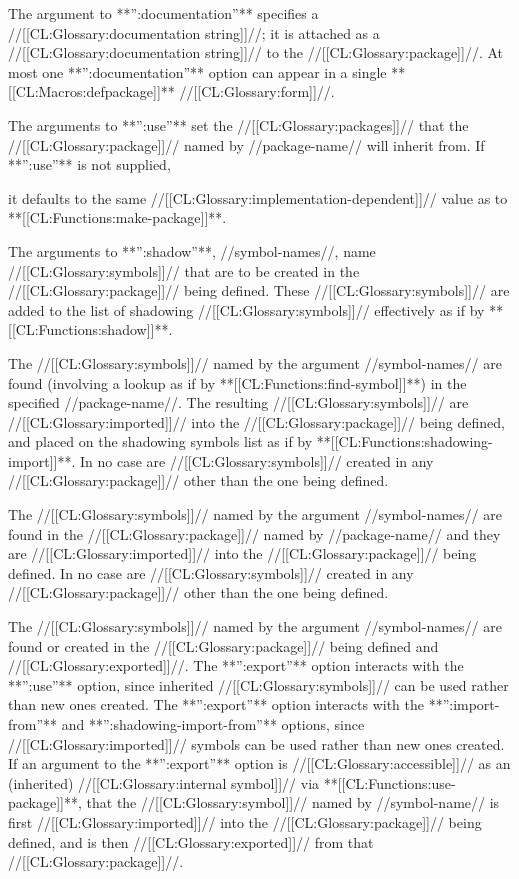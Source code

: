 The argument to **'':documentation''** specifies a //[[CL:Glossary:documentation string]]//; it is attached as a //[[CL:Glossary:documentation string]]// to the //[[CL:Glossary:package]]//. At most one **'':documentation''** option can appear in a single **[[CL:Macros:defpackage]]** //[[CL:Glossary:form]]//.


The arguments to **'':use''** set the //[[CL:Glossary:packages]]// that the //[[CL:Glossary:package]]// named by //package-name// will inherit from. If **'':use''** is not supplied,

it defaults to the same //[[CL:Glossary:implementation-dependent]]// value as  to **[[CL:Functions:make-package]]**.



The arguments to **'':shadow''**, //symbol-names//, name //[[CL:Glossary:symbols]]// that are to be created in the //[[CL:Glossary:package]]// being defined. These //[[CL:Glossary:symbols]]// are added to the list of shadowing //[[CL:Glossary:symbols]]// effectively as if by **[[CL:Functions:shadow]]**.


The //[[CL:Glossary:symbols]]// named by the argument //symbol-names// are found (involving a lookup as if by **[[CL:Functions:find-symbol]]**) in the specified //package-name//. The resulting //[[CL:Glossary:symbols]]// are //[[CL:Glossary:imported]]// into the //[[CL:Glossary:package]]// being defined, and placed on the shadowing symbols list as if by **[[CL:Functions:shadowing-import]]**. In no case are //[[CL:Glossary:symbols]]// created in any //[[CL:Glossary:package]]// other than the one being defined.


The //[[CL:Glossary:symbols]]// named by the argument //symbol-names// are found in the //[[CL:Glossary:package]]// named by //package-name// and they are //[[CL:Glossary:imported]]// into the //[[CL:Glossary:package]]// being defined. In no case are //[[CL:Glossary:symbols]]// created in any //[[CL:Glossary:package]]// other than the one being defined.


The //[[CL:Glossary:symbols]]// named by the argument //symbol-names// are found or created in the //[[CL:Glossary:package]]// being defined and //[[CL:Glossary:exported]]//. The **'':export''** option interacts with the **'':use''** option, since inherited //[[CL:Glossary:symbols]]// can be used rather than new ones created. The **'':export''** option interacts with the **'':import-from''** and **'':shadowing-import-from''** options, since //[[CL:Glossary:imported]]// symbols can be used rather than new ones created. If an argument to the **'':export''** option is //[[CL:Glossary:accessible]]// as an (inherited) //[[CL:Glossary:internal symbol]]// via **[[CL:Functions:use-package]]**, that the //[[CL:Glossary:symbol]]// named by //symbol-name// is first //[[CL:Glossary:imported]]// into the //[[CL:Glossary:package]]// being defined, and is then //[[CL:Glossary:exported]]// from that //[[CL:Glossary:package]]//.

